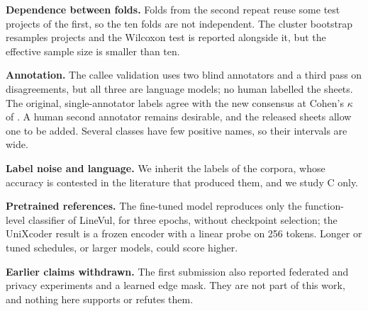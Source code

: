 \textbf{Dependence between folds.} Folds from the second repeat reuse some test
projects of the first, so the ten folds are not independent. The cluster
bootstrap resamples projects and the Wilcoxon test is reported alongside it, but
the effective sample size is smaller than ten.

\textbf{Annotation.} The callee validation uses two blind annotators and a
third pass on disagreements, but all three are language models; no human
labelled the sheets. The original, single-annotator labels agree with the new
consensus at Cohen's $\kappa$ of \numdevignOrigKappa{}. A human second
annotator remains desirable, and the released sheets allow one to be added.
Several classes have few positive names, so their intervals are wide.

\textbf{Label noise and language.} We inherit the labels of the corpora, whose
accuracy is contested in the literature that produced them, and we study C only.

\textbf{Pretrained references.} The fine-tuned model reproduces only the
function-level classifier of LineVul, for three epochs, without checkpoint
selection; the UniXcoder result is a frozen encoder with a linear probe on 256
tokens. Longer or tuned schedules, or larger models, could score higher.

\textbf{Earlier claims withdrawn.} The first submission also reported federated
and privacy experiments and a learned edge mask. They are not part of this
work, and nothing here supports or refutes them.
